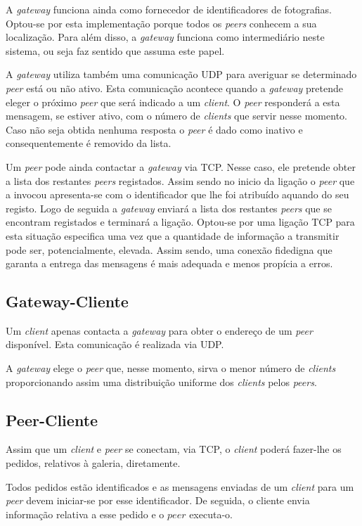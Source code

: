 \documentclass[a4paper, 12pt]{article}
\newcommand{\gateway}{\textit{gateway}\xspace}
\newcommand{\peer}{\textit{peer}\xspace}
\newcommand{\client}{\textit{client}\xspace}
\newcommand{\cliente}{\textit{client}\xspace}
\newcommand{\peers}{\textit{peers}\xspace}
\newcommand{\clients}{\textit{clients}\xspace}
\newcommand{\clientes}{\textit{clients}\xspace}
\begin{document}
A \gateway funciona ainda como fornecedor de identificadores de fotografias. Optou-se por esta implementação porque todos os \peers conhecem a sua localização. Para além disso, a \gateway funciona como intermediário neste sistema, ou seja faz sentido que assuma este papel.

A \gateway utiliza também uma comunicação UDP para averiguar se determinado \peer está ou não ativo. Esta comunicação acontece quando a \gateway pretende eleger o próximo \peer que será indicado a um \client. O \peer responderá a esta mensagem, se estiver ativo, com o número de \clients que servir nesse momento. Caso não seja obtida nenhuma resposta o \peer é dado como inativo e consequentemente é removido da lista.

Um \peer pode ainda contactar a \gateway via TCP. Nesse caso, ele pretende obter a lista dos restantes \peers registados. Assim sendo no inicio da ligação o \peer que a invocou apresenta-se com o identificador que lhe foi atribuído aquando do seu registo. Logo de seguida a \gateway enviará a lista dos restantes \peers que se encontram registados e terminará a ligação. Optou-se por uma ligação TCP para esta situação especifica uma vez que a quantidade de informação a transmitir pode ser, potencialmente, elevada. Assim sendo, uma conexão fidedigna que garanta a entrega das mensagens é mais adequada e menos propícia a erros.


\subsection{Gateway-Cliente}

Um \client apenas contacta a \gateway para obter o endereço de um \peer disponível. Esta comunicação é realizada via UDP.

A \gateway elege o \peer que, nesse momento, sirva o menor número de \clientes proporcionando assim uma distribuição uniforme dos \clientes pelos \peers.

\subsection{Peer-Cliente}



Assim que um \cliente e \peer se conectam, via TCP, o \cliente poderá fazer-lhe os pedidos, relativos à galeria, diretamente.

Todos pedidos estão identificados e as mensagens enviadas de um \cliente para um \peer devem iniciar-se por esse identificador. De seguida, o cliente envia informação relativa a esse pedido e o $peer$ executa-o.
\end{document}
